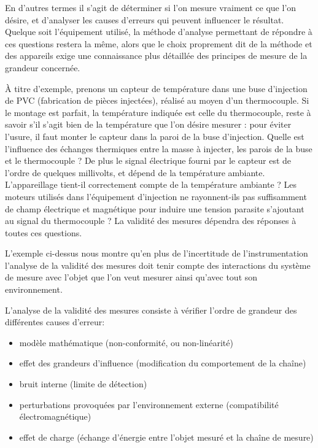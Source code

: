 En d'autres termes il s'agit de déterminer si l'on mesure vraiment ce que l'on désire, et d'analyser les causes d'erreurs qui peuvent influencer le résultat. Quelque soit l'équipement utilisé, la méthode d'analyse permettant de répondre à ces questions restera la même, alors que le choix proprement dit de la méthode et des appareils exige une connaissance plus détaillée des principes de mesure de la grandeur concernée.

À titre d'exemple, prenons un capteur de température dans une buse d'injection de PVC (fabrication de pièces injectées), réalisé au moyen d'un thermocouple. Si le montage est parfait, la température indiquée est celle du thermocouple, reste à savoir s'il s'agit bien de la température que l'on désire mesurer : pour éviter l'usure, il faut monter le capteur dans la paroi de la buse d'injection. Quelle est l'influence des échanges thermiques entre la masse à injecter, les parois de la buse et le thermocouple ? De plus le signal électrique fourni par le capteur est de l'ordre de quelques millivolts, et dépend de la température ambiante. L'appareillage tient-il correctement compte de la température ambiante ? Les moteurs utilisés dans l'équipement d'injection ne rayonnent-ils pas suffisamment de champ électrique et magnétique pour induire une tension parasite s'ajoutant au signal du thermocouple ? La validité des mesures dépendra des réponses à toutes ces questions.

L'exemple ci-dessus nous montre qu'en plus de l'incertitude de l'instrumentation l'analyse de la validité des mesures doit tenir compte des interactions du système de mesure avec l'objet que l'on veut mesurer ainsi qu'avec tout son environnement.

L'analyse de la validité des mesures consiste à vérifier l'ordre de grandeur des différentes causes d'erreur:

\begin{itemize}
    \item modèle mathématique (non-conformité, ou non-linéarité)
    \item effet des grandeurs d'influence (modification du comportement de la chaîne)
    \item bruit interne (limite de détection)
    \item perturbations provoquées par l'environnement externe (compatibilité électromagnétique)
    \item effet de charge (échange d'énergie entre l'objet mesuré et la chaîne de mesure)
\end{itemize}

